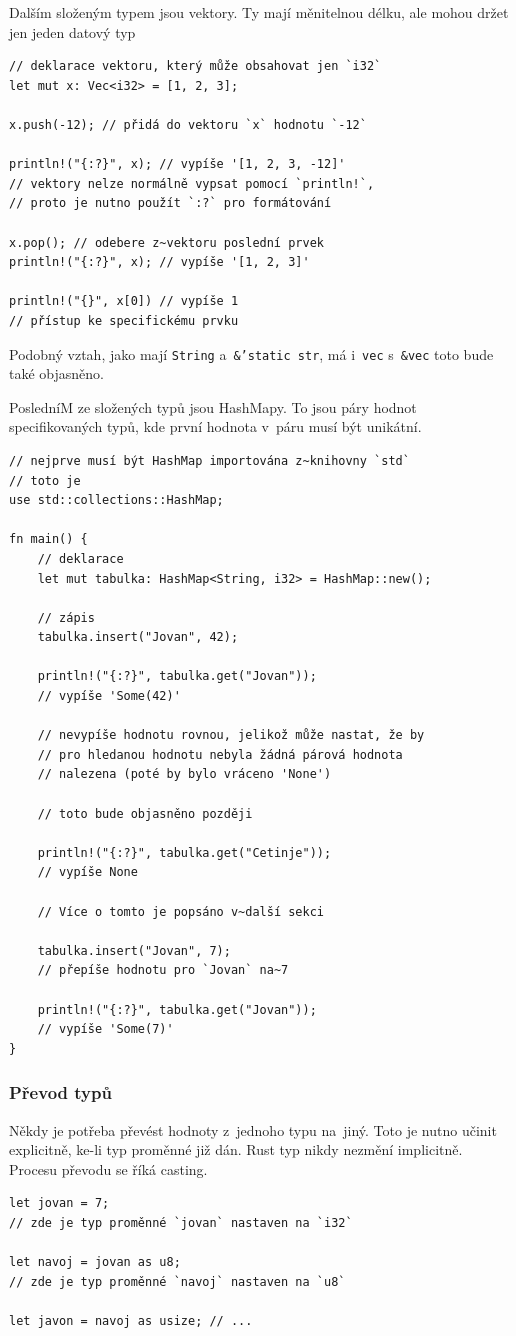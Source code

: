 \documentclass[a4paper, 12pt, twoside]{article} %
\newcommand{\rust}[1]{\texttt{#1}}
\begin{document}
			Dalším složeným typem jsou vektory. Ty mají měnitelnou délku, ale mohou držet jen jeden datový typ
			\begin{verbatim}
// deklarace vektoru, který může obsahovat jen `i32`
let mut x: Vec<i32> = [1, 2, 3];

x.push(-12); // přidá do vektoru `x` hodnotu `-12`

println!("{:?}", x); // vypíše '[1, 2, 3, -12]'
// vektory nelze normálně vypsat pomocí `println!`,
// proto je nutno použít `:?` pro formátování

x.pop(); // odebere z~vektoru poslední prvek
println!("{:?}", x); // vypíše '[1, 2, 3]'

println!("{}", x[0]) // vypíše 1
// přístup ke specifickému prvku
			\end{verbatim}
		
			Podobný vztah, jako mají \rust{String} a~\rust{&'static str}, má i~\rust{vec} s~\rust{&vec} toto bude také objasněno.
		
			PosledníM ze složených typů jsou HashMapy. To jsou páry hodnot specifikovaných typů, kde první hodnota v~páru musí být unikátní.
			\begin{verbatim}
// nejprve musí být HashMap importována z~knihovny `std`
// toto je 
use std::collections::HashMap;

fn main() {
	// deklarace
	let mut tabulka: HashMap<String, i32> = HashMap::new();

	// zápis
	tabulka.insert("Jovan", 42); 
	
	println!("{:?}", tabulka.get("Jovan"));
	// vypíše 'Some(42)'

	// nevypíše hodnotu rovnou, jelikož může nastat, že by
	// pro hledanou hodnotu nebyla žádná párová hodnota
	// nalezena (poté by bylo vráceno 'None')
	
	// toto bude objasněno později
	
	println!("{:?}", tabulka.get("Cetinje"));
	// vypíše None

	// Více o tomto je popsáno v~další sekci
	
	tabulka.insert("Jovan", 7);
	// přepíše hodnotu pro `Jovan` na~7
	
	println!("{:?}", tabulka.get("Jovan"));
	// vypíše 'Some(7)'
}
			\end{verbatim}
		
		\subsubsection*{Převod typů}
			Někdy je potřeba převést hodnoty z~jednoho typu na~jiný. Toto je nutno učinit explicitně, ke-li typ proměnné již dán. Rust typ nikdy nezmění implicitně. Procesu převodu se říká casting.
			\begin{verbatim}
let jovan = 7;
// zde je typ proměnné `jovan` nastaven na `i32` 

let navoj = jovan as u8;
// zde je typ proměnné `navoj` nastaven na `u8`

let javon = navoj as usize; // ...
			\end{verbatim}
			
\end{document}
